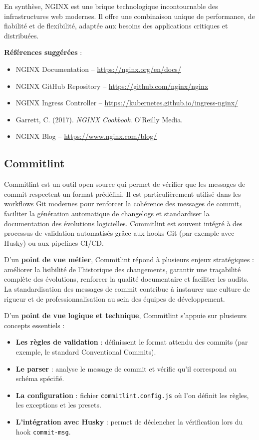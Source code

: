 En synthèse, NGINX est une brique technologique incontournable des infrastructures web modernes. Il offre une combinaison unique de performance, de fiabilité et de flexibilité, adaptée aux besoins des applications critiques et distribuées.

\textbf{Références suggérées} :
\begin{itemize}
	\item NGINX Documentation – \url{https://nginx.org/en/docs/}
	\item NGINX GitHub Repository – \url{https://github.com/nginx/nginx}
	\item NGINX Ingress Controller – \url{https://kubernetes.github.io/ingress-nginx/}
	\item Garrett, C. (2017). \textit{NGINX Cookbook}. O’Reilly Media.
	\item NGINX Blog – \url{https://www.nginx.com/blog/}
\end{itemize}


\subsection{Commitlint}

Commitlint est un outil open source qui permet de vérifier que les messages de commit respectent un format prédéfini. Il est particulièrement utilisé dans les workflows Git modernes pour renforcer la cohérence des messages de commit, faciliter la génération automatique de changelogs et standardiser la documentation des évolutions logicielles. Commitlint est souvent intégré à des processus de validation automatisés grâce aux hooks Git (par exemple avec Husky) ou aux pipelines CI/CD.

D’un \textbf{point de vue métier}, Commitlint répond à plusieurs enjeux stratégiques  : améliorer la lisibilité de l’historique des changements, garantir une traçabilité complète des évolutions, renforcer la qualité documentaire et faciliter les audits. La standardisation des messages de commit contribue à instaurer une culture de rigueur et de professionnalisation au sein des équipes de développement.

D’un \textbf{point de vue logique et technique}, Commitlint s’appuie sur plusieurs concepts essentiels  :
\begin{itemize}
	\item \textbf{Les règles de validation}  : définissent le format attendu des commits (par exemple, le standard Conventional Commits).
	\item \textbf{Le parser}  : analyse le message de commit et vérifie qu’il correspond au schéma spécifié.
	\item \textbf{La configuration}  : fichier \texttt{commitlint.config.js} où l’on définit les règles, les exceptions et les presets.
	\item \textbf{L’intégration avec Husky}  : permet de déclencher la vérification lors du hook \texttt{commit-msg}.
\end{itemize}


